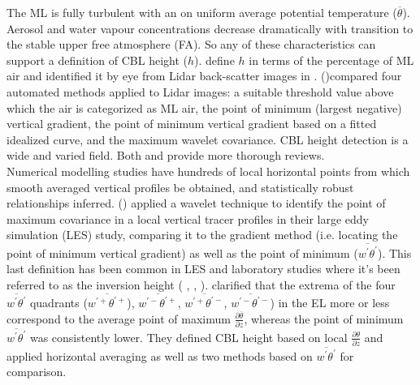 The \acs{ML} is fully turbulent with an on uniform average potential temperature ($\overline{\theta}$). Aerosol and water vapour concentrations decrease dramatically with transition to the stable upper free atmosphere (\acs{FA}).  So any of these characteristics can support
a definition of \acs{CBL} height ($h$).  \citeauthor{StullNelEl} \citeyear{StullNelEl} define $h$ in terms of the percentage of \acs{ML} air
and identified it by eye from Lidar back-scatter images in \cite{StullNelEl} \citeyear{StullNelEl}.  \citeauthor{Traum11} (\citeyear{Traum11})compared four automated methods applied to Lidar images: a suitable threshold value above which the air is categorized as \acs{ML} air,  the point of minimum (largest negative) vertical gradient, the point of minimum vertical gradient based on a fitted idealized curve, 
and the maximum wavelet covariance. \acs{CBL} height detection is a wide and varied field.  Both  \citeyear{BrooksFowler2}  and \citeauthor{SullMoengStev} \citeyear{SullMoengStev} provide more thorough reviews.\\

Numerical modelling studies have hundreds of local horizontal points
from which smooth averaged vertical profiles be obtained, and statistically robust relationships inferred. \citeauthor{BrooksFowler2} (\citeyear{BrooksFowler2}) applied a wavelet technique to identify the point of maximum covariance in a local vertical tracer profiles in their large eddy simulation (\acs{LES}) study, comparing it to the gradient method (i.e. locating the point of minimum vertical gradient) as well as the point of minimum ($\overline{w^{'}\theta^{'}}$).  This last definition has been common in \acs{LES} and laboratory studies where it's been referred to as the inversion height (\citeauthor{DearWill80} 
\citeyear{DearWill80}, \citeauthor{Sorbjan1} \citeyear{Sorbjan1}, \citeauthor{FedConzMir04} \citeyear{FedConzMir04}).  \citeauthor{SullMoengStev} \citeyear{SullMoengStev} clarified that the extrema of the four $\overline{w^{'}\theta^{'}}$ quadrants ($\overline{w^{'+}\theta^{'+}}$), $\overline{w^{'-}\theta^{'+}}$, $\overline{w^{'+}\theta^{'-}}$, $\overline{w^{'-}\theta^{'-}}$) in the \acs{EL} more or less correspond to the average point of maximum $\frac{\partial \overline{\theta}}{\partial z}$, whereas the point of minimum $\overline{w^{'}\theta^{'}}$ was consistently lower. They defined \acs{CBL} height based on local $\frac{\partial \theta}{\partial z}$ and applied horizontal averaging as well as two methods based on $\overline{w^{'}\theta^{'}}$
for comparison.\\

